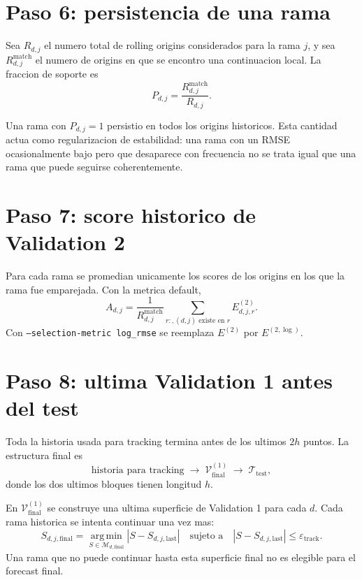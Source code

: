 \documentclass[11pt]{article}
\newcommand{\argmin}{\operatorname*{arg\,min}}
\begin{document}
\section{Paso 6: persistencia de una rama}

Sea \(R_{d,j}\) el numero total de rolling origins considerados para la rama
\(j\), y sea \(R^{\mathrm{match}}_{d,j}\) el numero de origins en que se encontro
una continuacion local. La fraccion de soporte es
\begin{equation}
P_{d,j}
=
\frac{R^{\mathrm{match}}_{d,j}}{R_{d,j}}.
\label{eq:support}
\end{equation}

Una rama con \(P_{d,j}=1\) persistio en todos los origins historicos. Esta
cantidad actua como regularizacion de estabilidad: una rama con un RMSE
ocasionalmente bajo pero que desaparece con frecuencia no se trata igual que
una rama que puede seguirse coherentemente.

\section{Paso 7: score historico de Validation 2}

Para cada rama se promedian unicamente los scores de los origins en los que la
rama fue emparejada. Con la metrica default,
\begin{equation}
A_{d,j}
=
\frac{1}{R^{\mathrm{match}}_{d,j}}
\sum_{r:,(d,j)\text{ existe en }r}
E^{(2)}_{d,j,r}.
\label{eq:branchscore}
\end{equation}
Con \texttt{--selection-metric log\_rmse} se reemplaza \(E^{(2)}\) por
\(E^{(2,\log)}\).

\section{Paso 8: ultima Validation 1 antes del test}

Toda la historia usada para tracking termina antes de los ultimos \(2h\) puntos.
La estructura final es
\[
\boxed{\text{historia para tracking}}
\;\longrightarrow\;
\boxed{\mathcal{V}^{(1)}_{\mathrm{final}}}
\;\longrightarrow\;
\boxed{\mathcal{T}_{\mathrm{test}}},
\]
donde los dos ultimos bloques tienen longitud \(h\).

En \(\mathcal{V}^{(1)}_{\mathrm{final}}\) se construye una ultima superficie de
Validation 1 para cada \(d\). Cada rama historica se intenta continuar una vez
mas:
\begin{equation}
S_{d,j,\mathrm{final}}
=
\argmin_{S\in\mathcal{M}_{d,\mathrm{final}}}
|S-S_{d,j,\mathrm{last}}|
\quad
\text{sujeto a}
\quad
|S-S_{d,j,\mathrm{last}}|
\le
\varepsilon_{\mathrm{track}}.
\label{eq:final-continuation}
\end{equation}
Una rama que no puede continuar hasta esta superficie final no es elegible para
el forecast final.
\end{document}
